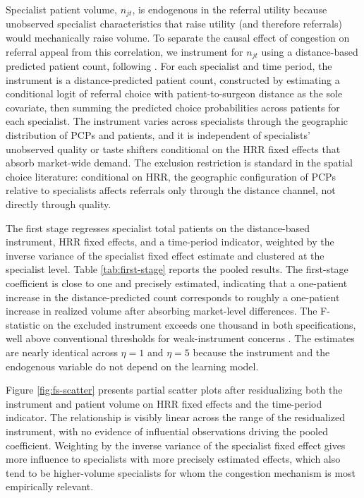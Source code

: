 \documentclass[12pt]{article}
\begin{document}
Specialist patient volume, $n_{jt}$, is endogenous in the referral utility because unobserved specialist characteristics that raise utility (and therefore referrals) would mechanically raise volume. To separate the causal effect of congestion on referral appeal from this correlation, we instrument for $n_{jt}$ using a distance-based predicted patient count, following \citet{richards-shubik2021}. For each specialist and time period, the instrument is a distance-predicted patient count, constructed by estimating a conditional logit of referral choice with patient-to-surgeon distance as the sole covariate, then summing the predicted choice probabilities across patients for each specialist. The instrument varies across specialists through the geographic distribution of PCPs and patients, and it is independent of specialists' unobserved quality or taste shifters conditional on the HRR fixed effects that absorb market-wide demand. The exclusion restriction is standard in the spatial choice literature: conditional on HRR, the geographic configuration of PCPs relative to specialists affects referrals only through the distance channel, not directly through quality.

The first stage regresses specialist total patients on the distance-based instrument, HRR fixed effects, and a time-period indicator, weighted by the inverse variance of the specialist fixed effect estimate and clustered at the specialist level. Table \ref{tab:first-stage} reports the pooled results. The first-stage coefficient is close to one and precisely estimated, indicating that a one-patient increase in the distance-predicted count corresponds to roughly a one-patient increase in realized volume after absorbing market-level differences. The F-statistic on the excluded instrument exceeds one thousand in both specifications, well above conventional thresholds for weak-instrument concerns \citep{stock2005}. The estimates are nearly identical across $\eta = 1$ and $\eta = 5$ because the instrument and the endogenous variable do not depend on the learning model.

Figure \ref{fig:fs-scatter} presents partial scatter plots after residualizing both the instrument and patient volume on HRR fixed effects and the time-period indicator. The relationship is visibly linear across the range of the residualized instrument, with no evidence of influential observations driving the pooled coefficient. Weighting by the inverse variance of the specialist fixed effect gives more influence to specialists with more precisely estimated effects, which also tend to be higher-volume specialists for whom the congestion mechanism is most empirically relevant.
\end{document}
